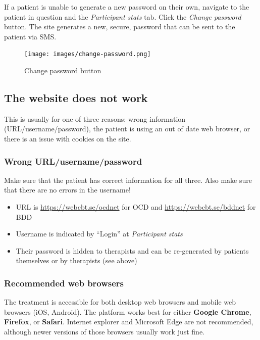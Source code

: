 \documentclass[]{book}
\providecommand{\tightlist}{%
  \setlength{\itemsep}{0pt}\setlength{\parskip}{0pt}}
\theoremstyle{definition}
\theoremstyle{definition}
\theoremstyle{definition}
\theoremstyle{remark}
\begin{document}
If a patient is unable to generate a new password on their own, navigate
to the patient in question and the \emph{Participant stats} tab. Click
the \emph{Change password} button. The site generates a new, secure,
password that can be sent to the patient via SMS.

\begin{figure}
\centering
\texttt{[image: images/change-password.png]}
\caption{Change password button}
\end{figure}

\hypertarget{the-website-does-not-work}{%
\subsection{The website does not work}\label{the-website-does-not-work}}

This is usually for one of three reasons: wrong information
(URL/username/password), the patient is using an out of date web
browser, or there is an issue with cookies on the site.

\hypertarget{wrong-urlusernamepassword}{%
\subsubsection{Wrong
URL/username/password}\label{wrong-urlusernamepassword}}

Make sure that the patient has correct information for all three. Also
make sure that there are no errors in the username!

\begin{itemize}
\tightlist
\item
  URL is \url{https://webcbt.se/ocdnet} for OCD and
  \url{https://webcbt.se/bddnet} for BDD
\item
  Username is indicated by ``Login'' at \emph{Participant stats}
\item
  Their password is hidden to therapists and can be re-generated by
  patients themselves or by therapists (see above)
\end{itemize}

\hypertarget{recommended-web-browsers}{%
\subsubsection{Recommended web
browsers}\label{recommended-web-browsers}}

The treatment is accessible for both desktop web browsers and mobile web
browsers (iOS, Android). The platform works best for either
\textbf{Google Chrome}, \textbf{Firefox}, or \textbf{Safari}. Internet
explorer and Microsoft Edge are not recommended, although newer versions
of those browsers usually work just fine.
\end{document}
